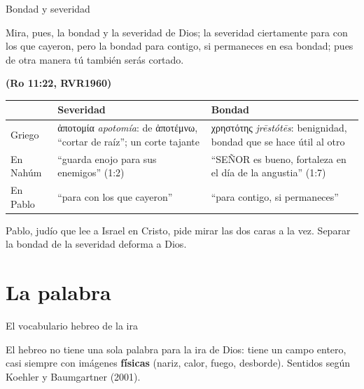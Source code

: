 \documentclass[hyperref={bookmarks=false},aspectratio=169]{beamer}
\newcommand{\heb}[1]{\mbox{\foreignlanguage{hebrew}{#1}}}
\newcommand{\grc}[1]{\foreignlanguage{ancientgreek}{#1}}
\newcommand{\SENOR}{S{\fontsize{0.78em}{1em}\selectfont EÑOR}}
\newcommand{\fuente}[1]{\par\hfill{\upshape\bfseries\footnotesize\textcolor{azul}{#1}}}
\newcommand{\destacar}[1]{\textbf{\textcolor{azul}{#1}}}
\begin{document}
\begin{frame}{Bondad y severidad}
\begin{cita}Mira, pues, la bondad y la severidad de Dios; la severidad ciertamente para con los que cayeron, pero la bondad para contigo, si permaneces en esa bondad; pues de otra manera tú también serás cortado.\fuente{(Ro 11:22, RVR1960)}\end{cita}
\scriptsize\renewcommand{\arraystretch}{1.25}
\begin{tabular}{@{}>{\RaggedRight\arraybackslash}p{2.6cm}>{\RaggedRight\arraybackslash}p{4.6cm}>{\RaggedRight\arraybackslash}p{4.6cm}@{}}
\toprule
& \textbf{Severidad} & \textbf{Bondad} \\ \midrule
Griego & \grc{ἀποτομία} \emph{apotomía}: de \grc{ἀποτέμνω}, ``cortar de raíz''; un corte tajante & \grc{χρηστότης} \emph{jrēstótēs}: benignidad, bondad que se hace útil al otro \\
En Nahúm & ``guarda enojo para sus enemigos'' (1:2) & ``\SENOR{} es bueno, fortaleza en el día de la angustia'' (1:7) \\
En Pablo & ``para con los que cayeron'' & ``para contigo, si permaneces'' \\
\bottomrule
\end{tabular}\par\medskip
\small\RaggedRight Pablo, judío que lee a Israel en Cristo, pide mirar las dos caras a la vez. Separar la bondad de la severidad deforma a Dios.
\end{frame}

\section{La palabra}

\begin{frame}{El vocabulario hebreo de la ira}
\centering
{}\par\smallskip
\small\RaggedRight El hebreo no tiene una sola palabra para la ira de Dios: tiene un campo entero, casi siempre con imágenes \destacar{físicas} (nariz, calor, fuego, desborde). Sentidos según Koehler y Baumgartner (2001).
\end{frame}
\end{document}
